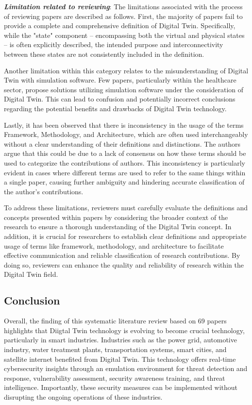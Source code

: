 \textbf{\textit{Limitation related to reviewing}}: The limitations associated with the process of reviewing papers are described as follows. First, the majority of papers fail to provide a complete and comprehensive definition of Digital Twin. Specifically, while the "state" component -- encompassing both the virtual and physical states -- is often explicitly described, the intended purpose and interconnectivity between these states are not consistently included in the definition.

Another limitation within this category relates to the misunderstanding of Digital Twin with simulation software. Few papers, particularly within the healthcare sector, propose solutions utilizing simulation software under the consideration of Digital Twin. This can lead to confusion and potentially incorrect conclusions regarding the potential benefits and drawbacks of Digital Twin technology.

 Lastly, it has been observed that there is inconsistency in the usage of the terms Framework, Methodology, and Architecture, which are often used interchangeably without a clear understanding of their definitions and distinctions. The authors argue that this could be due to a lack of consensus on how these terms should be used to categorize the contributions of authors. This inconsistency is particularly evident in cases where different terms are used to refer to the same things within a single paper, causing further ambiguity and hindering accurate classification of the author's contributions.

 To address these limitations, reviewers must carefully evaluate the definitions and concepts presented within papers by considering the broader context of the research to ensure a thorough understanding of the Digital Twin concept. In addition, it is crucial for researchers to establish clear definitions and appropriate usage of terms like framework, methodology, and architecture to facilitate effective communication and reliable classification of research contributions. By doing so, reviewers can enhance the quality and reliability of research within the Digital Twin field.


\subsection{Conclusion}
Overall, the finding of this systematic literature review based on 69 papers highlights that Diigtal Twin technology is evolving to become crucial technology, particularly in smart industries. Industries such as the power grid, automotive industry, water treatment plants, transportation systems, smart cities, and satellite internet benefited from Digital Twin. This technology offers real-time cybersecurity insights through an emulation environment for threat detection and response, vulnerability assessment, security awareness training, and threat intelligence. Importantly, these security measures can be implemented without disrupting the ongoing operations of these industries. 


